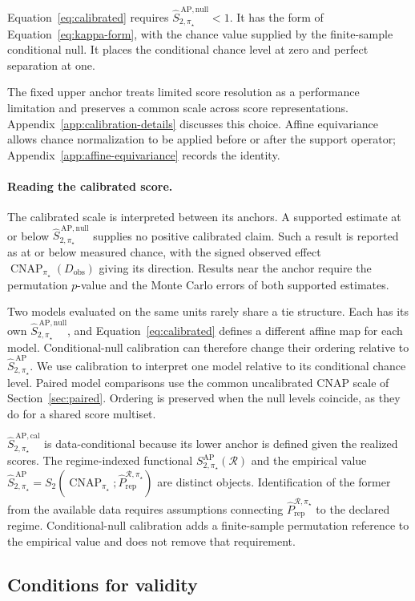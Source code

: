 \documentclass[11pt]{article}
\newcommand{\CNAP}{\operatorname{CNAP}}
\newcommand{\Regime}{\mathcal{R}}
\newcommand{\Tpi}{\CNAP_{\pi_\star}}
\newcommand{\SAPfull}{S_{2,\pi_\star}^{\mathrm{AP}}(\Regime)}
\newcommand{\SAPHat}{\widehat S_{2,\pi_\star}^{\,\mathrm{AP}}}
\newcommand{\SAPnullHat}{\widehat S_{2,\pi_\star}^{\,\mathrm{AP,null}}}
\newcommand{\SAPcalHat}{\widehat S_{2,\pi_\star}^{\,\mathrm{AP,cal}}}
\newcommand{\PRepHat}{\widehat{P}_{\mathrm{rep}}^{\Regime,\pi_\star}}
\theoremstyle{remark}
\begin{document}
Equation~\eqref{eq:calibrated} requires $\SAPnullHat<1$. It has the form of Equation~\eqref{eq:kappa-form}, with the chance value supplied by the finite-sample conditional null. It places the conditional chance level at zero and perfect separation at one.

The fixed upper anchor treats limited score resolution as a performance limitation and preserves a common scale across score representations. Appendix~\ref{app:calibration-details} discusses this choice. Affine equivariance allows chance normalization to be applied before or after the support operator; Appendix~\ref{app:affine-equivariance} records the identity.

\paragraph{Reading the calibrated score.}
The calibrated scale is interpreted between its anchors. A supported estimate at or below $\SAPnullHat$ supplies no positive calibrated claim. Such a result is reported as at or below measured chance, with the signed observed effect $\Tpi(D_{\mathrm{obs}})$ giving its direction. Results near the anchor require the permutation $p$-value and the Monte Carlo errors of both supported estimates.

Two models evaluated on the same units rarely share a tie structure. Each has its own $\SAPnullHat$, and Equation~\eqref{eq:calibrated} defines a different affine map for each model. Conditional-null calibration can therefore change their ordering relative to $\SAPHat$. We use calibration to interpret one model relative to its conditional chance level. Paired model comparisons use the common uncalibrated CNAP scale of Section~\ref{sec:paired}. Ordering is preserved when the null levels coincide, as they do for a shared score multiset.

$\SAPcalHat$ is data-conditional because its lower anchor is defined given the realized scores. The regime-indexed functional $\SAPfull$ and the empirical value $\SAPHat=S_2(\CNAP_{\pi_\star};\PRepHat)$ are distinct objects. Identification of the former from the available data requires assumptions connecting $\PRepHat$ to the declared regime. Conditional-null calibration adds a finite-sample permutation reference to the empirical value and does not remove that requirement.

\subsection{Conditions for validity}
\label{sec:caveats}
\end{document}
